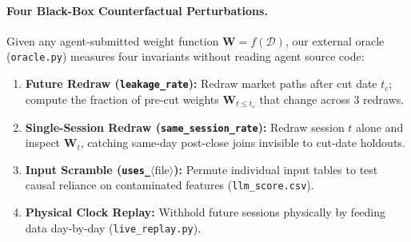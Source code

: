 \paragraph{Four Black-Box Counterfactual Perturbations.}
Given any agent-submitted weight function $\mathbf{W} = f(\mathcal{D})$, our external oracle (\texttt{oracle.py}) measures four invariants without reading agent source code:
\begin{enumerate}
    \item \textbf{Future Redraw (\texttt{leakage\_\allowbreak rate}):} Redraw market paths after cut date $t_c$; compute the fraction of pre-cut weights $\mathbf{W}_{t \le t_c}$ that change across 3 redraws.
    \item \textbf{Single-Session Redraw (\texttt{same\_\allowbreak session\_\allowbreak rate}):} Redraw session $t$ alone and inspect $\mathbf{W}_t$, catching same-day post-close joins invisible to cut-date holdouts.
    \item \textbf{Input Scramble (\texttt{uses\_}$\langle\text{file}\rangle$):} Permute individual input tables to test causal reliance on contaminated features (\texttt{llm\_\allowbreak score.csv}).
    \item \textbf{Physical Clock Replay:} Withhold future sessions physically by feeding data day-by-day (\texttt{live\_\allowbreak replay.py}).
\end{enumerate}

\begin{table}[t]
\centering
{}
\vspace{-0.12cm}
\caption{Instrument calibration ($^*$illusory paper Sharpe). Static year holdout (\texttt{2023}) fails to punish same-session leakage ($22.80$); physical clock replay exposes it ($-0.58$).}
\label{tab:calibration}
\vspace{-0.15cm}
\end{table}
